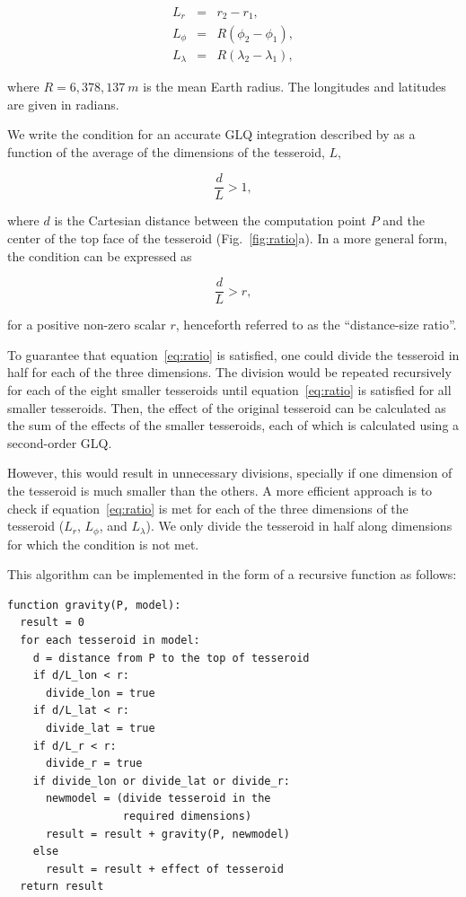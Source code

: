 \begin{eqnarray}
    L_r &=& r_2 - r_1,\\
    L_\phi &=& R(\phi_2 - \phi_1),\\
    L_\lambda &=& R(\lambda_2 - \lambda_1),
\end{eqnarray}

\noindent
where $R=6,378,137\ m$ is the mean Earth radius.
The longitudes and latitudes are given in radians.

We write the condition for an accurate GLQ integration
described by \citet{Ku1977}
as a function of
the average of the dimensions of the tesseroid, $L$,

\begin{equation}
    \frac{d}{L} > 1,
\end{equation}

\noindent
where $d$ is the Cartesian distance
between the computation point $P$
and the center of the top face of the tesseroid
(Fig.~\ref{fig:ratio}a).
In a more general form, the condition can be expressed as

\begin{equation}
    \frac{d}{L} > r,
    \label{eq:ratio}
\end{equation}

\noindent
for a positive non-zero scalar $r$,
henceforth referred to as
the ``distance-size ratio''.

To guarantee that equation~\ref{eq:ratio} is satisfied,
one could divide the tesseroid in half for each of the three dimensions.
The division would be repeated recursively
for each of the eight smaller tesseroids
until equation~\ref{eq:ratio} is satisfied for all smaller tesseroids.
Then, the effect of the original tesseroid can be calculated
as the sum of the
effects of the smaller tesseroids,
each of which is calculated using a second-order GLQ.

However, this would result in unnecessary divisions,
specially if one dimension of the tesseroid is much smaller than the others.
A more efficient approach is
to check if equation~\ref{eq:ratio} is met
for each of the three dimensions of the tesseroid
($L_r$, $L_\phi$, and $L_\lambda$).
We only divide the tesseroid in half
along dimensions for which the condition is not met.

This algorithm can be implemented
in the form of a recursive function
as follows:

\begin{verbatim}
function gravity(P, model):
  result = 0
  for each tesseroid in model:
    d = distance from P to the top of tesseroid
    if d/L_lon < r:
      divide_lon = true
    if d/L_lat < r:
      divide_lat = true
    if d/L_r < r:
      divide_r = true
    if divide_lon or divide_lat or divide_r:
      newmodel = (divide tesseroid in the
                  required dimensions)
      result = result + gravity(P, newmodel)
    else
      result = result + effect of tesseroid
  return result
\end{verbatim}

